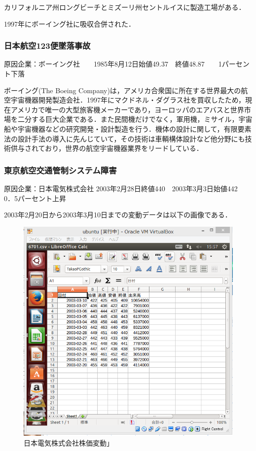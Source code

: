 {カリフォルニア州ロングビーチとミズーリ州セントルイスに製造工場がある．

1997年にボーイング社に吸収合併された\cite{dagurasu}．

\subsubsection{日本航空123便墜落事故}
原因企業：ボーイング社　　1985年8月12日始値49.37　終値48.87　　1パーセント下落

ボーイング(The Boeing Company)は，アメリカ合衆国に所在する世界最大の航空宇宙機器開発製造会社．1997年にマクドネル・ダグラス社を買収したため，現在アメリカで唯一の大型旅客機メーカーであり，ヨーロッパのエアバスと世界市場を二分する巨大企業である．また民間機だけでなく，軍用機，ミサイル，宇宙船や宇宙機器などの研究開発・設計製造を行う．機体の設計に関して，有限要素法の設計手法の導入に先んじていて，その技術は車輌構体設計など他分野にも技術供与されており，世界の航空宇宙機器業界をリードしている\cite{boing}．

\subsubsection{東京航空交通管制システム障害}
原因企業：日本電気株式会社  2003年2月28日終値440　2003年3月3日始値442　0．5パーセント上昇



2003年2月20日から2003年3月10日までの変動データは以下の画像である．

\begin{figure}[H]
\centering
\includegraphics[width=15cm]{6701csv.PNG}
\caption{日本電気株式会社株価変動」}\label{サンプル図}
\end{figure}


}
